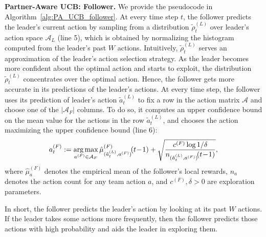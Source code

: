 \documentclass[letterpaper]{article} %
\theoremstyle{definition}
\def\argmax{\mathop{\rm arg\,max}}
\def\mc{\mathcal}
\begin{document}
\smallskip
\noindent \textbf{Partner-Aware UCB: Follower.} 
We provide the pseudocode in Algorithm~\ref{alg:PA_UCB_follower}. At every time step $t$, the follower predicts the leader's current action by sampling from a distribution $\tilde{\rho}^{(L)}_t$ over leader's action space $\mc{A}_L$ (line 5), which is obtained by normalizing the histogram computed from the leader's past $W$ actions. Intuitively, $\tilde{\rho}^{(L)}_t$ serves an approximation of the leader's action selection strategy. As the leader becomes more confident about the optimal action and starts to exploit, the distribution $\tilde{\rho}^{(L)}_t$ concentrates over the optimal action. Hence, the follower gets more accurate in its predictions of the leader's actions. At every time step, the follower uses its prediction of leader's action $\tilde{a}^{(L)}_t$ to fix a row in the action matrix $\mc{A}$ and choose one of the $|\mc{A}_F|$ columns. To do so, it computes an upper confidence bound on the mean value for the actions in the row $\tilde{a}^{(L)}_t$, and chooses the action maximizing the upper confidence bound (line 6):
\begin{align*}
    a^{(F)}_t := \argmax_{a^{(F)} \in \mc{A}_F} \hat{\mu}^{(F)}_{(\tilde{a}^{(L)}_t,a^{(F)})}\!(t\!-\!1) + \sqrt{\frac{c^{(F)} \log 1/\delta}{n_{(\tilde{a}^{(L)}_t,a^{(F)})}\!(t\!-\!1)}},
\end{align*}
where $\hat{\mu}^{(F)}_a$ denotes the empirical mean of the follower's local rewards, $n_a$ denotes the action count for any team action $a$, and $c^{(F)},\delta>0$ are exploration parameters.

In short, the follower predicts the leader's action by looking at its past $W$ actions. If the leader takes some actions more frequently, then the follower predicts those actions with high probability and aids the leader in exploring them.
\end{document}
